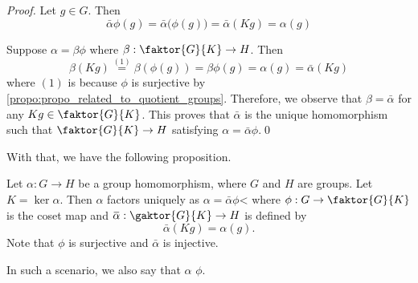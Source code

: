 \begin{proof}
  Let $g \in G$. Then
  \begin{equation*}
    \bar{\alpha} \phi (g) = \bar{\alpha} \big( \phi(g) \big) = \bar{\alpha} (Kg) = \alpha(g)
  \end{equation*}

  Suppose $\alpha = \beta \phi$ where $\beta : \faktor{G}{K} \to H$. Then
  \begin{equation*}
    \beta (Kg) \overset{(1)}{=} \beta ( \phi(g) ) = \beta \phi(g) = \alpha(g) = \bar{\alpha} (Kg)
  \end{equation*}
  where $(1)$ is because $\phi$ is surjective by \cref{propo:propo_related_to_quotient_groups}. Therefore, we observe that $\beta = \bar{\alpha}$ for any $Kg \in \faktor{G}{K}$. This proves that $\bar{\alpha}$ is the unique homomorphism such that $\faktor{G}{K} \to H$ satisfying $\alpha = \bar{\alpha} \phi$.\qed
\end{proof}

With that, we have the following proposition.

\begin{propo}
\label{propo:uniqueness_of_homomorphism_factors}
  Let $\alpha : G \to H$ be a group homomorphism, where $G$ and $H$ are groups. Let $K = \ker \alpha$. Then $\alpha$ factors uniquely as $\alpha = \bar{\alpha} \phi$< where $\phi : G \to \faktor{G}{K}$ is the coset map and $\bar{\alpha} : \gaktor{G}{K} \to H$ is defined by
  \begin{equation*}
    \bar{\alpha} (Kg) = \alpha(g).
  \end{equation*}
  Note that $\phi$ is surjective and $\bar{\alpha}$ is injective.

  In such a scenario, we also say that $\alpha$  $\phi$.
\end{propo}

